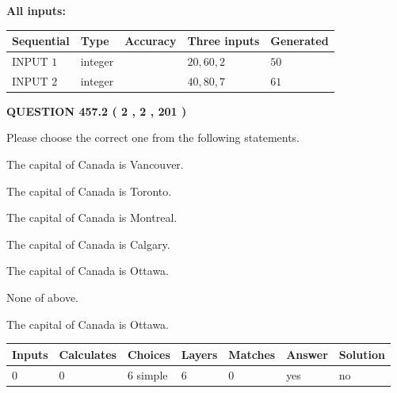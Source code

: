 \documentclass[12pt]{article}
\begin{document}
   
   
   
\noindent\vspace{0.1in}\hspace{-0.08in} {\textbf{\Large{All inputs: }}}
   
   
  
  
\noindent\begin{tabular}{|l|l|l|l|l|}
\hline
 Sequential & Type & Accuracy & Three inputs & Generated \\ 
\hline
 
 
  INPUT $  1 $ & integer &  & $
 20
 , 
 60
 , 
 2
 $ & $ 50 $ 
 \\  \hline  
 
 
  INPUT $  2 $ & integer &  & $
 40
 , 
 80
 , 
 7
 $ & $ 61 $ 
 \\  \hline  
 \end{tabular}
   
   
  
\vspace{0.2in}
  
{\textbf{\Large{QUESTION
457.2 
 ( 2 , 2 , 201 )
}}}
  
  
Please choose the correct one from the following statements.
 
 
The capital of Canada is Vancouver.
 
 
The capital of Canada is Toronto.
 
 
The capital of Canada is Montreal.
 
 
The capital of Canada is Calgary.
 
 
The capital of Canada is Ottawa.
 
 
 None of above.
 
 
\noindent{}
 
 
The capital of Canada is Ottawa.
 
 
\noindent{}
 
 
   
   
   
   
\noindent\begin{tabular}{|l|l|l|l|l|l|l|}
 \hline
Inputs & Calculates & Choices & Layers & Matches & Answer & Solution \\ \hline
 0  & 
 0  & 
 6
  simple  
  & 
 6  & 
 0  & 
  yes & 
  no 
  \\ \hline
 \end{tabular}
   
\end{document}

